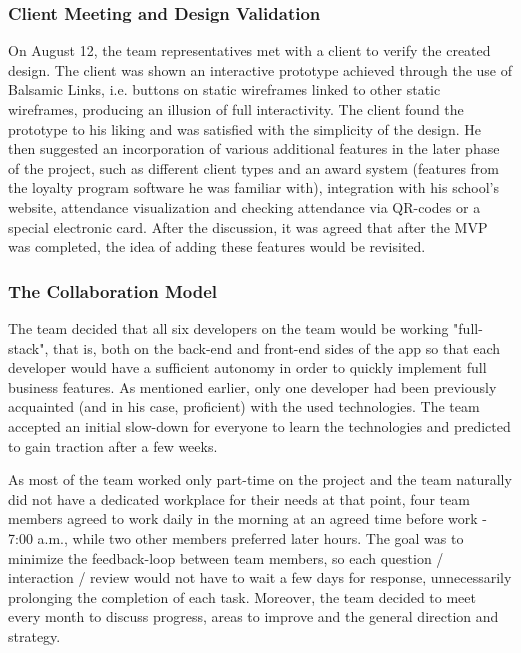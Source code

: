 \documentclass{article}
\begin{document}
\subsubsection{Client Meeting and Design Validation}
On August 12, the team representatives met with a client to verify the created design. The client was shown an interactive prototype achieved through the use of Balsamic Links, i.e. buttons on static wireframes linked to other static wireframes, producing an illusion of full interactivity. The client found the prototype to his liking and was satisfied with the simplicity of the design. He then suggested an incorporation of various additional features in the later phase of the project, such as different client types and an award system (features from the loyalty program software he was familiar with), integration with his school's website, attendance visualization and checking attendance via QR-codes or a special electronic card. After the discussion, it was agreed that after the MVP was completed, the idea of adding these features would be revisited.

\subsubsection{The Collaboration Model}
The team decided that all six developers on the team would be working "full-stack", that is, both on the back-end and front-end sides of the app so that each developer would have a sufficient autonomy in order to quickly implement full business features. As mentioned earlier, only one developer had been previously acquainted (and in his case, proficient) with the used technologies. The team accepted an initial slow-down for everyone to learn the technologies and predicted to gain traction after a few weeks.

As most of the team worked only part-time on the project and the team naturally did not have a dedicated workplace for their needs at that point, four team members agreed to work daily in the morning at an agreed time before work - 7:00 a.m., while two other members preferred later hours. The goal was to minimize the feedback-loop between team members, so each question / interaction / review would not have to wait a few days for response, unnecessarily prolonging the completion of each task. Moreover, the team decided to meet every month to discuss progress, areas to improve and the general direction and strategy.
\end{document}
